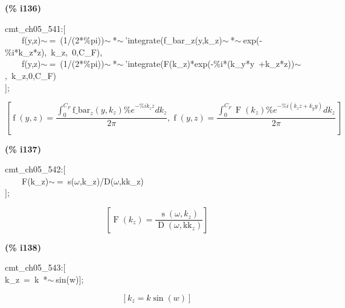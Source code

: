 \documentclass[fleqn]{article}
\begin{document}
\noindent
\begin{minipage}[t]{4.000000em}\color{red}\bfseries
(\% i136)	
\end{minipage}
\begin{minipage}[t]{\textwidth}\color{blue}
cmt\_ch05\_541:[\\
\ \ \ \ f(y,z)\ensuremath{\sim\ }=\ (1/(2*\%pi))\ensuremath{\sim\ }*\ensuremath{\sim\ }'integrate(f\_bar\_z(y,k\_z)\ensuremath{\sim\ }*\ensuremath{\sim\ }exp(-\%i*k\_z*z),\ k\_z,\ 0,C\_F),\\
\ \ \ \ f(y,z)\ensuremath{\sim\ }=\ (1/(2*\%pi))\ensuremath{\sim\ }*\ensuremath{\sim\ }'integrate(F(k\_z)*exp(-\%i*(k\_y*y\ +k\_z*z))\ensuremath{\sim\ },\ k\_z,0,C\_F)\\
];
\end{minipage}
\[\displaystyle \tag{\% o136} 
\operatorname{[}\operatorname{f}\left( y\operatorname{,}z\right) =\frac{\int_{0}^{{C_F}}{\left. {{\ensuremath{\mathrm{f\_ bar}}}_z}\left( y\operatorname{,}{k_z}\right)  {{\% e}^{-\% i {k_z} z}}d{k_z}\right.}}{2 \ensuremath{\pi} }\operatorname{,}\operatorname{f}\left( y\operatorname{,}z\right) =\frac{\int_{0}^{{C_F}}{\left. \operatorname{F}\left( {k_z}\right)  {{\% e}^{-\% i \left( {k_z} z+{k_y} y\right) }}d{k_z}\right.}}{2 \ensuremath{\pi} }\operatorname{]}\mbox{}
\]


\noindent
\begin{minipage}[t]{4.000000em}\color{red}\bfseries
(\% i137)	
\end{minipage}
\begin{minipage}[t]{\textwidth}\color{blue}
cmt\_ch05\_542:[\\
\ \ \ \ F(k\_z)\ensuremath{\sim\ }=\ s(\ensuremath{\omega},k\_z)/D(\ensuremath{\omega},kk\_z)\\
];
\end{minipage}
\[\displaystyle \tag{\% o137} 
\left[ \operatorname{F}\left( {k_z}\right) =\frac{\operatorname{s}\left( \omega \operatorname{,}{k_z}\right) }{\operatorname{D}\left( \omega \operatorname{,}{{\ensuremath{\mathrm{kk}}}_z}\right) }\right] \mbox{}
\]


\noindent
\begin{minipage}[t]{4.000000em}\color{red}\bfseries
(\% i138)	
\end{minipage}
\begin{minipage}[t]{\textwidth}\color{blue}
cmt\_ch05\_543:[\\
k\_z\ =\ k\ *\ensuremath{\sim\ }sin(w)];
\end{minipage}
\[\displaystyle \tag{\% o138} 
\left[ {k_z}=k \sin{(w)}\right] \mbox{}
\]
\end{document}
